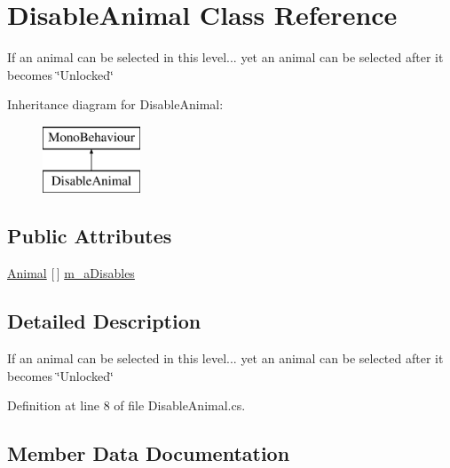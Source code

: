 \hypertarget{class_disable_animal}{}\section{Disable\+Animal Class Reference}
\label{class_disable_animal}


If an animal can be selected in this level... yet an animal can be selected after it becomes \char`\"{}\+Unlocked\char`\"{}  


Inheritance diagram for Disable\+Animal\+:\begin{figure}[H]
\begin{center}
\leavevmode
\includegraphics[height=2.000000cm]{class_disable_animal}
\end{center}
\end{figure}
\subsection*{Public Attributes}
\begin{DoxyCompactItemize}
\item 
\mbox{\hyperlink{class_animal}{Animal}} \mbox{[}$\,$\mbox{]} \mbox{\hyperlink{class_disable_animal_ab3d3c45ca112d64231f2aeb1de362119}{m\+\_\+a\+Disables}}
\end{DoxyCompactItemize}


\subsection{Detailed Description}
If an animal can be selected in this level... yet an animal can be selected after it becomes \char`\"{}\+Unlocked\char`\"{} 



Definition at line 8 of file Disable\+Animal.\+cs.



\subsection{Member Data Documentation}
\mbox{\label{class_disable_animal_ab3d3c45ca112d64231f2aeb1de362119}} 
